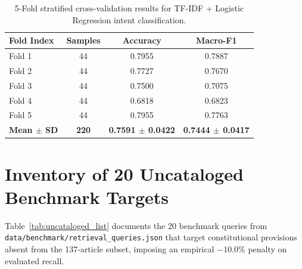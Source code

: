 \documentclass[10pt,twocolumn]{article}
\begin{document}
\begin{table}[h]
\centering
\small
\caption{5-Fold stratified cross-validation results for TF-IDF + Logistic Regression intent classification.}
\begin{tabularx}{\columnwidth}{Xccc}
\toprule
\textbf{Fold Index} & \textbf{Samples} & \textbf{Accuracy} & \textbf{Macro-F1} \\
\midrule
Fold 1 & 44 & 0.7955 & 0.7887 \\
Fold 2 & 44 & 0.7727 & 0.7670 \\
Fold 3 & 44 & 0.7500 & 0.7075 \\
Fold 4 & 44 & 0.6818 & 0.6823 \\
Fold 5 & 44 & 0.7955 & 0.7763 \\
\midrule
\textbf{Mean $\pm$ SD} & \textbf{220} & \textbf{0.7591 $\pm$ 0.0422} & \textbf{0.7444 $\pm$ 0.0417} \\
\bottomrule
\end{tabularx}
\label{tab:intent_cv_folds}
\end{table}

\section{Inventory of 20 Uncataloged Benchmark Targets}
\label{app:uncataloged_queries}

Table~\ref{tab:uncataloged_list} documents the 20 benchmark queries from \texttt{data/benchmark/retrieval\_queries.json} that target constitutional provisions absent from the 137-article subset, imposing an empirical $-10.0\%$ penalty on evaluated recall.
\end{document}
